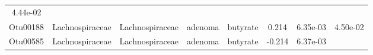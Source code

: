 \documentclass[11pt,]{article}
\begin{document}
\begin{longtable}[]{@{}cccccccc@{}}
\begin{minipage}[t]{0.08\columnwidth}
4.44e-02\strut
\end{minipage}\tabularnewline
\begin{minipage}[t]{0.08\columnwidth}\centering\strut
Otu00188\strut
\end{minipage} & \begin{minipage}[t]{0.15\columnwidth}\centering\strut
Lachnospiraceae\strut
\end{minipage} & \begin{minipage}[t]{0.15\columnwidth}\centering\strut
Lachnospiraceae\strut
\end{minipage} & \begin{minipage}[t]{0.08\columnwidth}\centering\strut
adenoma\strut
\end{minipage} & \begin{minipage}[t]{0.09\columnwidth}\centering\strut
butyrate\strut
\end{minipage} & \begin{minipage}[t]{0.07\columnwidth}\centering\strut
0.214\strut
\end{minipage} & \begin{minipage}[t]{0.08\columnwidth}\centering\strut
6.35e-03\strut
\end{minipage} & \begin{minipage}[t]{0.08\columnwidth}\centering\strut
4.50e-02\strut
\end{minipage}\tabularnewline
\begin{minipage}[t]{0.08\columnwidth}\centering\strut
Otu00585\strut
\end{minipage} & \begin{minipage}[t]{0.15\columnwidth}\centering\strut
Lachnospiraceae\strut
\end{minipage} & \begin{minipage}[t]{0.15\columnwidth}\centering\strut
Lachnospiraceae\strut
\end{minipage} & \begin{minipage}[t]{0.08\columnwidth}\centering\strut
adenoma\strut
\end{minipage} & \begin{minipage}[t]{0.09\columnwidth}\centering\strut
butyrate\strut
\end{minipage} & \begin{minipage}[t]{0.07\columnwidth}\centering\strut
-0.214\strut
\end{minipage} & \begin{minipage}[t]{0.08\columnwidth}\centering\strut
6.37e-03\strut
\end{minipage} & \begin{minipage}[t]{0.08\columnwidth}\centering\strut

\end{minipage}
\end{longtable}
\end{document}
